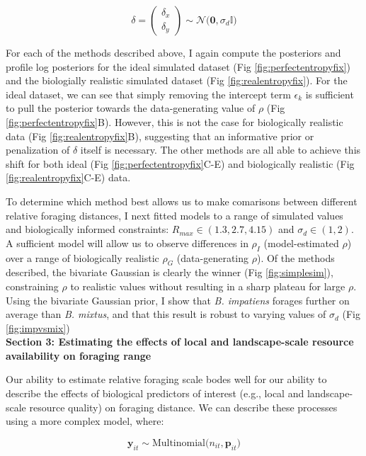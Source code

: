 \documentclass[11pt]{article}
\begin{document}
\[
\delta =
\begin{pmatrix} \delta_x \\ \delta_y \end{pmatrix}
\sim \mathcal{N}\Big(\boldsymbol{0}, \sigma_d \mathbb{I}\Big)
\]

For each of the methods described above, I again compute the posteriors and profile log posteriors for the ideal simulated dataset (Fig \ref{fig:perfectentropyfix}) and the biologially realistic simulated dataset (Fig \ref{fig:realentropyfix}). For the ideal dataset, we can see that simply removing the intercept term $\epsilon_k$ is sufficient to pull the posterior towards the data-generating value of $\rho$ (Fig \ref{fig:perfectentropyfix}B). However, this is not the case for biologically realistic data (Fig \ref{fig:realentropyfix}B), suggesting that an informative prior or penalization of $\delta$ itself is necessary. The other methods are all able to achieve this shift for both ideal (Fig \ref{fig:perfectentropyfix}C-E) and biologically realistic (Fig \ref{fig:realentropyfix}C-E) data.

To determine which method best allows us to make comarisons between different relative foraging distances, I next fitted models to a range of simulated values and biologically informed constraints: $R_{max} \in (1.3, 2.7, 4.15)$ and $\sigma_d \in (1, 2)$. A sufficient model will allow us to observe differences in $\rho_I$ (model-estimated $\rho$) over a range of biologically realistic $\rho_G$ (data-generating $\rho$). Of the methods described, the bivariate Gaussian is clearly the winner (Fig \ref{fig:simplesim}), constraining $\rho$ to realistic values without resulting in a sharp plateau for large $\rho$. Using the bivariate Gaussian prior, I show that \emph{B. impatiens} forages further on average than \emph{B. mixtus}, and that this result is robust to varying values of $\sigma_d$ (Fig \ref{fig:impvsmix}) \\


\noindent \textbf{Section 3: Estimating the effects of local and landscape-scale resource availability on foraging range}

\noindent Our ability to estimate relative foraging scale bodes well for our ability to describe the effects of biological predictors of interest (e.g., local and landscape-scale resource quality) on foraging distance. We can describe these processes using a more complex model, where:

\[
\mathbf{y}_{it} \sim \text{Multinomial}\big(n_{it}, \mathbf{p}_{it} \big)
\]
\end{document}
